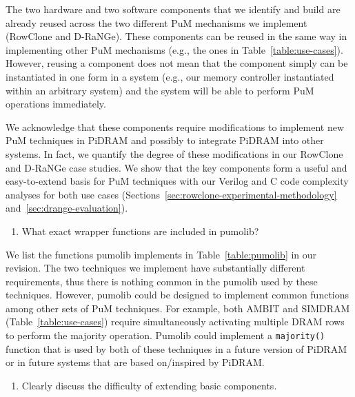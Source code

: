 The two hardware and two software components that we identify and build are already reused across the two different PuM mechanisms we implement (RowClone and D-RaNGe). These components can be reused in the same way in implementing other PuM mechanisms (e.g., the ones in Table~\ref{table:use-cases}). However, reusing a component does not mean that the component simply can be instantiated in one form in a system (e.g., our memory controller instantiated within an arbitrary system) and the system will be able to perform PuM operations immediately. 

We acknowledge that these components require modifications to implement new PuM techniques in PiDRAM and possibly to integrate PiDRAM into other systems. In fact, we quantify the degree of these modifications in our RowClone and D-RaNGe case studies. We show that the key components form a useful and easy-to-extend basis for PuM techniques with our Verilog and C code complexity analyses for both use cases (Sections~\ref{sec:rowclone-experimental-methodology} and~\ref{sec:drange-evaluation}).


\bigbreak
\begin{tcolorbox}
    \begin{enumerate}[label=R3/\arabic*]
        \addtocounter{enumi}{2}
        \item \label{q:r3q3} What exact wrapper functions are included in pumolib?
    \end{enumerate}
\end{tcolorbox} 

We list the functions pumolib implements in Table~\ref{table:pumolib} in our revision. The two techniques we implement have substantially different requirements, thus there is nothing common in the pumolib used by these techniques. However, pumolib could be designed to implement common functions among other sets of PuM techniques. For example, both AMBIT and SIMDRAM (Table~\ref{table:use-cases}) require simultaneously activating multiple DRAM rows to perform the majority operation. Pumolib could implement a \texttt{majority()} function that is used by both of these techniques in a future version of PiDRAM or in future systems that are based on/inspired by PiDRAM.

\bigbreak
\begin{tcolorbox}
    \begin{enumerate}[label=R3/\arabic*]
       \addtocounter{enumi}{3}
        \item \label{q:r3q4} Clearly discuss the difficulty of extending basic components.
    \end{enumerate}
\end{tcolorbox} 

